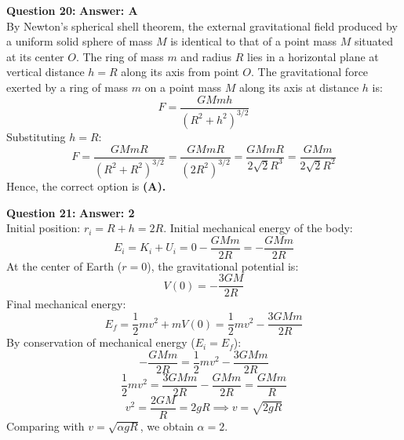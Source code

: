 \documentclass[11pt,a4paper]{article}
\begin{document}
\begin{tcolorbox}[solbox]
  \textbf{\textcolor{primaryDark}{Question 20:}} \hfill \textbf{\textcolor{l3Crimson}{Answer: A}}\\
  \vspace{3pt}
  By Newton's spherical shell theorem, the external gravitational field produced by a uniform solid sphere of mass $M$ is identical to that of a point mass $M$ situated at its center $O$.
\vspace{3pt}
The ring of mass $m$ and radius $R$ lies in a horizontal plane at vertical distance $h = R$ along its axis from point $O$.
The gravitational force exerted by a ring of mass $m$ on a point mass $M$ along its axis at distance $h$ is:
$$F = \frac{GMmh}{(R^2 + h^2)^{3/2}}$$
\vspace{3pt}
Substituting $h = R$:
$$F = \frac{GMm R}{(R^2 + R^2)^{3/2}} = \frac{GMm R}{(2R^2)^{3/2}} = \frac{GMm R}{2\sqrt{2}R^3} = \frac{GMm}{2\sqrt{2}R^2}$$
\vspace{3pt}
Hence, the correct option is \textbf{(A)}\textbf{.}
\end{tcolorbox}
\vspace{3pt}

\begin{tcolorbox}[solbox]
  \textbf{\textcolor{primaryDark}{Question 21:}} \hfill \textbf{\textcolor{l3Crimson}{Answer: 2}}\\
  \vspace{3pt}
  Initial position: $r_i = R + h = 2R$.
Initial mechanical energy of the body:
$$E_i = K_i + U_i = 0 - \frac{GMm}{2R} = -\frac{GMm}{2R}$$
\vspace{3pt}
At the center of Earth ($r = 0$), the gravitational potential is:
$$V(0) = -\frac{3GM}{2R}$$
Final mechanical energy:
$$E_f = \frac{1}{2}m v^2 + m V(0) = \frac{1}{2}m v^2 - \frac{3GMm}{2R}$$
\vspace{3pt}
By conservation of mechanical energy ($E_i = E_f$):
$$-\frac{GMm}{2R} = \frac{1}{2}m v^2 - \frac{3GMm}{2R}$$
$$\frac{1}{2}m v^2 = \frac{3GMm}{2R} - \frac{GMm}{2R} = \frac{GMm}{R}$$
$$v^2 = \frac{2GM}{R} = 2gR \implies v = \sqrt{2gR}$$
\vspace{3pt}
Comparing with $v = \sqrt{\alpha g R}$, we obtain $\alpha = 2$.
\end{tcolorbox}
\vspace{3pt}
\end{document}
